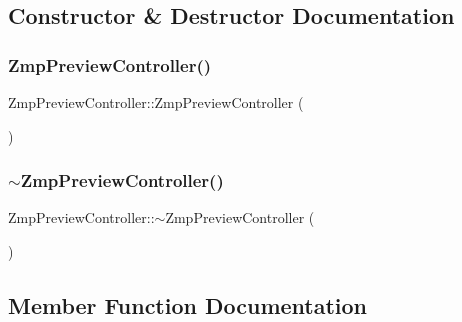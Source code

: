 \subsection{Constructor \& Destructor Documentation}
\hypertarget{classZmpPreviewController_ac8837fd39b0b942afd3dd5759c456b42}{}\label{classZmpPreviewController_ac8837fd39b0b942afd3dd5759c456b42} 
\subsubsection{\texorpdfstring{Zmp\+Preview\+Controller()}{ZmpPreviewController()}}
{\footnotesize\ttfamily Zmp\+Preview\+Controller\+::\+Zmp\+Preview\+Controller (\begin{DoxyParamCaption}{ }\end{DoxyParamCaption})}

\hypertarget{classZmpPreviewController_af702c45f318c7a78310d19cc061886dd}{}\label{classZmpPreviewController_af702c45f318c7a78310d19cc061886dd} 
\subsubsection{\texorpdfstring{$\sim$\+Zmp\+Preview\+Controller()}{~ZmpPreviewController()}}
{\footnotesize\ttfamily Zmp\+Preview\+Controller\+::$\sim$\+Zmp\+Preview\+Controller (\begin{DoxyParamCaption}{ }\end{DoxyParamCaption})}



\subsection{Member Function Documentation}
\hypertarget{classZmpPreviewController_a378a6408072c1d7b962e8e52af30b634}{}\label{classZmpPreviewController_a378a6408072c1d7b962e8e52af30b634} 
